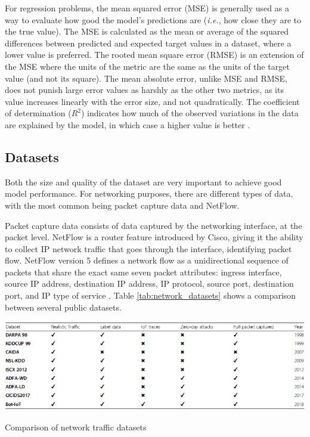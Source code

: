 For regression problems, the mean squared error (MSE) is generally used as a way to evaluate how good the model's predictions are (\textit{i.e.}, how close they are to the true value). The MSE is calculated as the mean or average of the squared differences between predicted and expected target values in a dataset, where a lower value is preferred. The rooted mean square error (RMSE) is an extension of the MSE where the units of the metric are the same as the units of the target value (and not its square). The mean absolute error, unlike MSE and RMSE, does not punish large error values as harshly as the other two metrics, as its value increases linearly with the error size, and not quadratically. The coefficient of determination ($R^2$) indicates how much of the observed variations in the data are explained by the model, in which case a higher value is better \citep{Handelman2019, Brownlee2021}.

\subsection{Datasets}

Both the size and quality of the dataset are very important to achieve good model performance. For networking purposes, there are different types of data, with the most common being packet capture data and NetFlow.\par

Packet capture data consists of data captured by the networking interface, at the packet level. NetFlow is a router feature introduced by Cisco, giving it the ability to collect IP network traffic that goes through the interface, identifying packet flow. NetFlow version 5 defines a network flow as a unidirectional sequence of packets that share the exact same seven packet attributes: ingress interface, source IP address, destination IP address, IP protocol, source port, destination port, and IP type of service \citep{Handelman2019}. Table \ref{tab:network_datasets} shows a comparison between several public datasets.

\begin{table}
    \centering
    \includegraphics[width = \textwidth]{img/parts/introduction/Network Datasets.png}
    \caption{Comparison of network traffic datasets \citep{Khraisat2019}}
    \label{tab:network_datasets}
\end{table}

